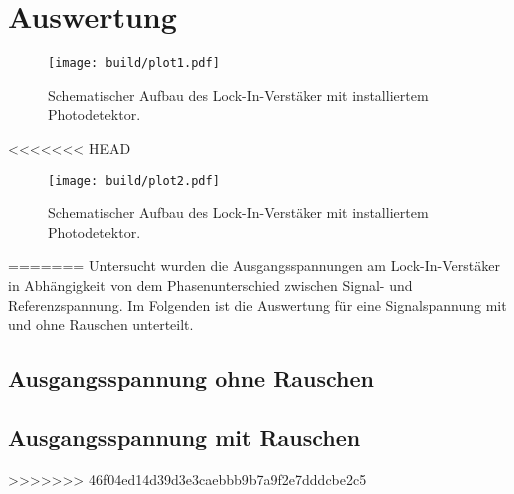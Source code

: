 \section{Auswertung}
\begin{figure}
    \centering
    \texttt{[image: build/plot1.pdf]}
    \caption{Schematischer Aufbau des Lock-In-Verstäker mit installiertem Photodetektor. \cite{skript}} 
    \label{fig:licht}
\end{figure}

<<<<<<< HEAD
\begin{figure}
    \centering
    \texttt{[image: build/plot2.pdf]}
    \caption{Schematischer Aufbau des Lock-In-Verstäker mit installiertem Photodetektor. \cite{skript}} 
    \label{fig:licht2}
\end{figure}
=======
Untersucht wurden die Ausgangsspannungen am Lock-In-Verstäker in Abhängigkeit von dem Phasenunterschied zwischen Signal- und Referenzspannung. Im Folgenden ist die Auswertung 
für eine Signalspannung mit und ohne Rauschen unterteilt.

\subsection{Ausgangsspannung ohne Rauschen}


\subsection{Ausgangsspannung mit Rauschen}
>>>>>>> 46f04ed14d39d3e3caebbb9b7a9f2e7dddcbe2c5
